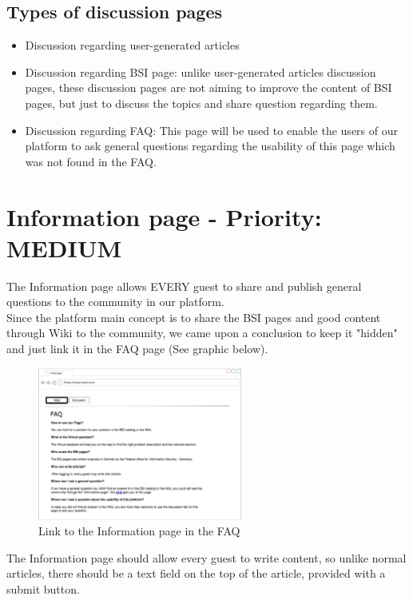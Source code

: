 \subsection{Types of discussion pages}
\begin{itemize}
\item Discussion regarding user-generated articles
\item Discussion regarding BSI page: unlike user-generated articles discussion pages, these discussion pages are not aiming to improve the content of BSI pages, but just to discuss the topics and share question regarding them.
\item Discussion regarding FAQ: This page will be used to enable the users of our platform to ask general questions regarding the usability of this page which was not found in the FAQ.
 
 \end{itemize}
 
\section{Information page - Priority: MEDIUM}
 The Information page allows EVERY guest to share and publish general questions to the community in our platform.\\
 Since the platform main concept is to share the BSI pages and good content through Wiki to the community, we came upon a conclusion to keep it "hidden" and just link it in the FAQ page (See graphic below). \\
 
 \begin{figure}[h] 
    \centering
    \includegraphics[width=0.6\textwidth]{Pictures/information1.jpg}
    \caption{Link to the Information page in the FAQ}
\end{figure} 

The Information page should allow every guest to write content, so unlike normal articles, there should be a text field on the top of the article, provided with a submit button.

